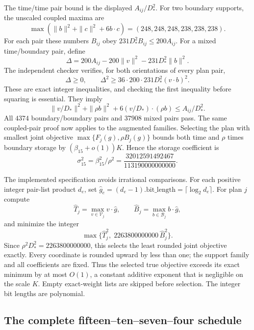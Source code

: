 The time/time pair bound is the displayed $A_{ij}/D_*^2$. For two boundary
supports, the unscaled coupled maxima are
\[
 \max(\|b\|^2+\|c\|^2+6b\cdot c)
 =(248,248,248,238,238,238).
\]
For each pair these numbers $B_{ij}$ obey
$231D_*^2B_{ij}\le200A_{ij}$. For a mixed time/boundary pair, define
\[
 \Delta=200A_{ij}-200\|v\|^2-231D_*^2\|b\|^2.
\]
The independent checker verifies, for both orientations of every plan pair,
\[
 \Delta\ge0,\qquad
 \Delta^2\ge36\cdot200\cdot231D_*^2(v\cdot b)^2.
\]
These are exact integer inequalities, and checking the first inequality
before squaring is essential. They imply
\[
 \|v/D_*\|^2+\|\rho b\|^2
       +6(v/D_*)\cdot(\rho b)\le A_{ij}/D_*^2.
\]
All $4374$ boundary/boundary pairs and $37908$ mixed pairs pass.
The same coupled-pair proof now applies to the augmented families.
Selecting the plan with smallest joint objective
$\max\{F_j(g),\rho B_j(g)\}$ bounds both time and $\rho$ times boundary
storage by $(\beta_{15}+o(1))K$. Hence the storage coefficient is
\[
 \sigma_{15}^2=\beta_{15}^2/\rho^2
 =\frac{32012591492467}{113190000000000}.
\]

The implemented specification avoids irrational comparisons. For each
positive integer pair-list product $d_e$, set
$\widehat g_e=(d_e-1).\mathrm{bit\_length}=\lceil\log_2d_e\rceil$.
For plan $j$ compute
\[
 \widehat T_j=\max_{v\in\mathcal V_j}v\cdot\widehat g,
 \qquad \widehat B_j=\max_{b\in\mathcal B_j}b\cdot\widehat g,
\]
and minimize the integer
\[
 \max\{\widehat T_j^2,\;2263800000000\,\widehat B_j^2\}.
\]
Since $\rho^2D_*^2=2263800000000$, this selects the least rounded joint
objective exactly. Every coordinate is rounded upward by less than one;
the support family and all coefficients are fixed. Thus the selected true
objective exceeds its exact minimum by at most $O(1)$, a constant additive
exponent that is negligible on the scale $K$. Empty exact-weight lists
are skipped before selection. The integer bit lengths are polynomial.

\subsection{The complete fifteen--ten--seven--four schedule}

